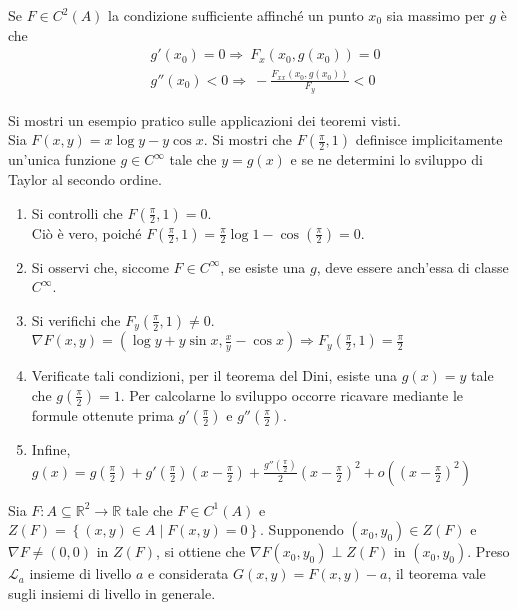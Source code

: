 \begin{oss}
    Se $F \in C^2(A)$ la condizione sufficiente affinché un punto $x_0$ sia massimo per $g$ è che
    \begin{equation}
        \begin{aligned}
            &g'(x_0)=0 \Rightarrow\ F_x(x_0, g(x_0))=0\\
            &g''(x_0)<0 \Rightarrow\ -\frac{F_{xx}(x_0, g(x_0))}{F_y} < 0
        \end{aligned}
    \end{equation}
\end{oss}
\begin{example}
    Si mostri un esempio pratico sulle applicazioni dei teoremi visti.\\
    Sia $F(x,y)=x \log y - y \cos x$. Si mostri che $F\left(\tfrac{\pi}{2}, 1\right)$ definisce implicitamente un'unica funzione $g \in C^\infty$ tale che $y=g(x)$ e se ne determini lo sviluppo di Taylor al secondo ordine. 
    \begin{enumerate}
        \item Si controlli che $F\left(\tfrac{\pi}{2}, 1\right)=0$.\\
        Ciò è vero, poiché $F\left(\tfrac{\pi}{2}, 1\right)=\tfrac{\pi}{2} \log 1 - \cos\left(\tfrac{\pi}{2}\right)=0$.
        \item Si osservi che, siccome $F \in C^\infty$, se esiste una $g$, deve essere anch'essa di classe $C^\infty$.
        \item Si verifichi che $F_y(\tfrac{\pi}{2}, 1) \neq 0$.\\
        $\nabla F(x, y) = (\log y + y \sin{x}, \tfrac{x}{y}- \cos{x}) \Rightarrow F_y(\tfrac{\pi}{2},1)=\tfrac{\pi}{2}$
        \item Verificate tali condizioni, per il teorema del Dini, esiste una $g(x)=y$ tale che $g(\tfrac{\pi}{2})=1$. Per calcolarne lo sviluppo occorre ricavare mediante le formule ottenute prima $g'(\tfrac{\pi}{2})$ e $g''(\tfrac{\pi}{2})$.
        \item Infine, $g(x)=g\left(\tfrac{\pi}{2}\right) + g'\left(\tfrac{\pi}{2}\right)\left(x-\tfrac{\pi}{2}\right)+ \tfrac{g''\left(\tfrac{\pi}{2}\right)}{2}\left(x-\tfrac{\pi}{2}\right)^2+ o\left(\left(x-\tfrac{\pi}{2}\right)^2\right)$
    \end{enumerate}
\end{example}
\begin{theorem} \label{Teo: Ortogonalità del gradiente alle curve di livello}
    Sia $F: A \subseteq \mathbb{R}^2 \to \mathbb{R}$ tale che $F \in C^1(A)$ e $Z(F)= \left\{(x,y) \in A \mid F(x,y)=0\right\}$. Supponendo $(x_0,y_0) \in Z(F)$ e $\nabla F \neq (0,0)$ in $Z(F)$, si ottiene che $\nabla F(x_0,y_0) \perp Z(F)$ in $(x_0, y_0)$. Preso $\mathcal{L}_a$ insieme di livello $a$ e considerata $G(x,y)=F(x,y)-a$, il teorema vale sugli insiemi di livello in generale.
\end{theorem}
